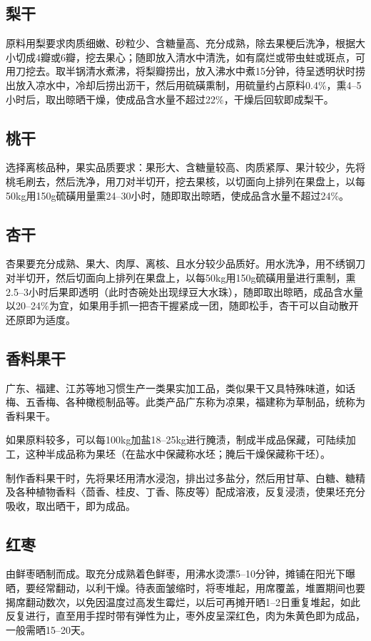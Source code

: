 \documentclass{ctexbook}
\begin{document}
\subsection{梨干}
原料用梨要求肉质细嫩、砂粒少、含糖量高、充分成熟，除去果梗后洗净，根据大小切成4瓣或6瓣，挖去果心；随即放入清水中清洗，如有腐烂或带虫蛀或斑点，可用刀挖去。取半锅清水煮沸，将梨瓣捞出，放入沸水中煮15分钟，待呈透明状时捞出放入凉水中，冷却后捞出沥干，然后用硫磺熏制，用硫量约占原料0.4\%，熏4--5小时后，取出晾晒干燥，使成品含水量不超过22\%，干燥后回软即成梨干。
\subsection{桃干}
选择离核品种，果实品质要求：果形大、含糖量较高、肉质紧厚、果汁较少，先将桃毛刷去，然后洗净，用刀对半切开，挖去果核，以切面向上排列在果盘上，以每50kg用150g硫磺用量熏24--30小时，随即取出晾晒，使成品含水量不超过24\%。
\subsection{杏干}
杏果要充分成熟、果大、肉厚、离核、且水分较少品质好。用水洗净，用不绣钢刀对半切开，然后切面向上排列在果盘上，以每50kg用150g硫磺用量进行熏制，熏2.5--3小时后果即透明（此时杏碗处出现绿豆大水珠），随即取出晾晒，成品含水量以20--24\%为宜，如果用手抓一把杏干握紧成一团，随即松手，杏干可以自动散开还原即为适度。
\subsection{香料果干}
广东、福建、江苏等地习惯生产一类果实加工品，类似果干又具特殊味道，如话梅、五香梅、各种橄榄制品等。此类产品广东称为凉果，福建称为草制品，统称为香料果干。

如果原料较多，可以每100kg加盐18--25kg进行腌渍，制成半成品保藏，可陆续加工，这种半成品称为果坯（在盐水中保藏称水坯；腌后干燥保藏称干坯）。

制作香料果干时，先将果坯用清水浸泡，排出过多盐分，然后用甘草、白糖、糖精及各种植物香料〈茴香、桂皮、丁香、陈皮等）配成溶液，反复浸渍，使果坯充分吸收，取出晒干，即为成品。
\subsection{红枣}
由鲜枣晒制而成。取充分成熟着色鲜枣，用沸水烫漂5--10分钟，摊铺在阳光下曝晒，要经常翻动，以利干燥。待表面皱缩时，将枣堆起，用席覆盖，堆置期间也要揭席翻动数次，以免因温度过高发生霉烂，以后可再摊开晒1--2日重复堆起，如此反复进行，直至用手捏时带有弹性为止，枣外皮呈深红色，肉为朱黄色即为成品，一般需晒15--20天。
\end{document}

